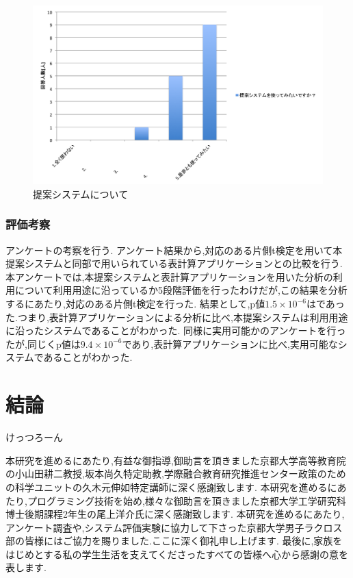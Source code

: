 \documentclass[sotsuron]{kuee}
\begin{document}
			\begin{figure}
				\begin{center}
					\includegraphics[width=\linewidth]{./png/result08.png}
				\end{center}
				\caption{提案システムについて}
		  		\label{fig:result08}
			\end{figure}
		\subsection{評価考察}
			アンケートの考察を行う.
			アンケート結果から,対応のある片側t検定を用いて本提案システムと同部で用いられている表計算アプリケーションとの比較を行う.
			本アンケートでは,本提案システムと表計算アプリケーションを用いた分析の利用について利用用途に沿っているか5段階評価を行ったわけだが,この結果を分析するにあたり,対応のある片側t検定を行った.
			結果として,p値$1.5 \times 10^{-6}$はであった.つまり,表計算アプリケーションによる分析に比べ,本提案システムは利用用途に沿ったシステムであることがわかった.
			同様に実用可能かのアンケートを行ったが,同じくp値は$9.4 \times 10^{-6}$であり,表計算アプリケーションに比べ,実用可能なシステムであることがわかった.

\chapter{結論}
けっつろーん


\begin{acknowledgements}
	本研究を進めるにあたり,有益な御指導,御助言を頂きました京都大学高等教育院の小山田耕二教授,坂本尚久特定助教,学際融合教育研究推進センター政策のための科学ユニットの久木元伸如特定講師に深く感謝致します.
	本研究を進めるにあたり,プログラミング技術を始め,様々な御助言を頂きました京都大学工学研究科博士後期課程2年生の尾上洋介氏に深く感謝致します.
	本研究を進めるにあたり,アンケート調査や,システム評価実験に協力して下さった京都大学男子ラクロス部の皆様にはご協力を賜りました.ここに深く御礼申し上げます.
	最後に,家族をはじめとする私の学生生活を支えてくださったすべての皆様へ心から感謝の意を表します.
\end{acknowledgements}
\end{document}
